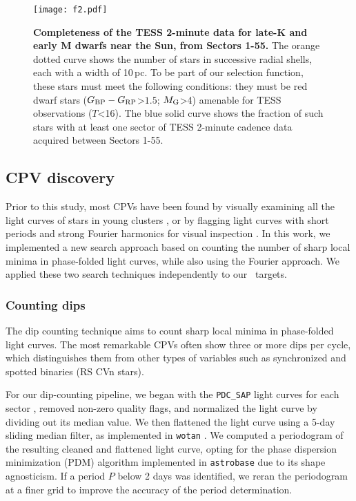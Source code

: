 \documentclass[11pt,twocolumn,tighten,linenumbers]{aastex63}
\newcommand{\bprp}{G_{\rm BP} - G_{\rm RP}}
\begin{document}
\begin{figure}[!t]
	\begin{center}
		\centering
		\texttt{[image: f2.pdf]}
		\vspace{-0.2cm}
		\caption{
      {\bf Completeness of the TESS 2-minute data for late-K and early
      M dwarfs near the Sun, from Sectors 1-55.}  The orange dotted
      curve shows the number of stars in successive radial shells,
      each with a width of 10\,pc.  To be part of our selection
      function, these stars must meet the following conditions: they
      must be red dwarf stars ($\bprp$>$1.5$; $M_{\rm G}$>4) amenable
      for TESS observations ($T$<16).  The blue solid curve shows the
      fraction of such stars with at least one sector of TESS 2-minute
      cadence data acquired between Sectors 1-55.
		}
			\vspace{-0.5cm}
		\label{fig:completeness}
	\end{center}
\end{figure}



\subsection{CPV discovery}
\label{subsec:discoverymethods}

Prior to this study, most CPVs have been found by visually examining
all the light curves of stars in young clusters
\citep{2016AJ....152..114R,2017AJ....153..152S,2023ApJ...945..114P},
or by flagging light curves with short periods and strong Fourier
harmonics for visual inspection \citep{2019ApJ...876..127Z}.  In this
work, we implemented a new search approach based on counting the
number of sharp local minima in phase-folded light curves, while also
using the Fourier approach.  We applied these two search techniques
independently to our \nstarssearched\ targets.


\subsubsection{Counting dips}
\label{subsec:counting}

The dip counting technique aims to count sharp local minima in
phase-folded light curves.  The most remarkable CPVs often show three
or more dips per cycle, which distinguishes them from other types of
variables such as synchronized and spotted binaries (RS CVn stars).

For our dip-counting pipeline, we began with the {\tt PDC\_SAP} light
curves for each sector \citep{2017ksci.rept....8S}, removed non-zero
quality flags, and normalized the light curve by dividing out its
median value.  We then flattened the light curve using a 5-day sliding
median filter, as implemented in \texttt{wotan}
\citep{2019AJ....158..143H}.  We computed a periodogram of the
resulting cleaned and flattened light curve, opting for the
\citet{1978ApJ...224..953S} phase dispersion minimization (PDM)
algorithm implemented in \texttt{astrobase}
\citep{2021zndo...1011188B} due to its shape agnosticism.  If a period
$P$ below 2 days was identified, we reran the periodogram at a finer
grid to improve the accuracy of the period determination.
\end{document}

